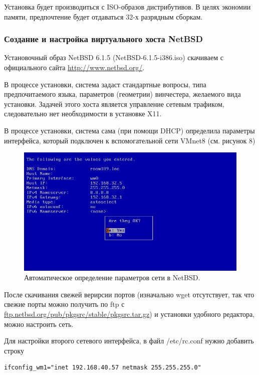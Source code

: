 Установка будет производиться с ISO-образов дистрибутивов. В целях экономии памяти, предпочтение будет отдаваться 32-х разрядным сборкам.

\subsubsection{Создание и настройка виртуального хоста NetBSD}

Установочный образ NetBSD 6.1.5 (NetBSD-6.1.5-i386.iso) скачиваем с официального сайта \url{http://www.netbsd.org/}.

В процессе установки, система задаст стандартные вопросы, типа предпочитаемого языка, параметров (геометрии) винчестера, желаемого вида установки. Задачей этого хоста является управление сетевым трафиком, следовательно нет необходимости в установке X11.

В процессе установки, система сама (при помощи DHCP) определила параметры интерфейса, который подключен к вспомогательной сети VMnet8 (см. рисунок 8)

\begin{figure}[h!]
\centering
\includegraphics[scale=0.9]{res/netbsd-setup}
\caption{Автоматическое определение параметров сети в NetBSD.}
\end{figure}

После скачивания свежей верирсии портов (изначально wget отсутствует, так что свежие порты можно получить по ftp с \url{ftp.netbsd.org/pub/pkgsrc/stable/pkgsrc.tar.gz}) и установки удобного редактора, можно настроить сеть.

Для настройки второго сетевого интерфейса, в файл /etc/rc.conf нужно добавить строку
\begin{Verbatim}[frame=single]
ifconfig_wm1="inet 192.168.40.57 netmask 255.255.255.0"
\end{Verbatim}


